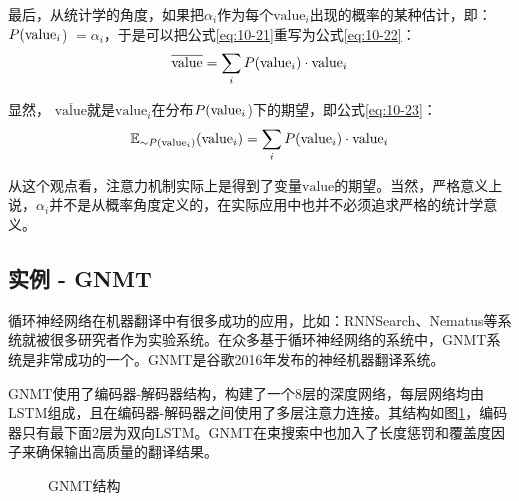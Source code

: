 \parinterval 最后，从统计学的角度，如果把$\alpha_i$作为每个$\mathrm{value}_i$出现的概率的某种估计，即：$ {P} (\mathrm{value}_i$) $= \alpha_i$，于是可以把公式\eqref{eq:10-21}重写为公式\eqref{eq:10-22}：
\begin{eqnarray}
\overline{\mathrm{value}} = \sum_i {P} ( {\mathrm{value}}_i) \cdot {\mathrm{value}}_i
\label{eq:10-22}
\end{eqnarray}

\noindent 显然， $\overline{\mathrm{value}}$就是$\mathrm{value}_i$在分布$ {P}( \mathrm{value}_i$)下的期望，即公式\eqref{eq:10-23}：
\begin{equation}
\mathbb{E}_{\sim \\ {P} ( {\mathrm{\mathrm{value}}}_i )} ({\mathrm{value}}_i) = \sum_i {P} ({\mathrm{value}}_i) \cdot {\mathrm{value}}_i
\label{eq:10-23}
\end{equation}

从这个观点看，注意力机制实际上是得到了变量$\mathrm{value}$的期望。当然，严格意义上说，$\alpha_i$并不是从概率角度定义的，在实际应用中也并不必须追求严格的统计学意义。

\subsection{实例 - GNMT}
\vspace{0.5em}

\parinterval 循环神经网络在机器翻译中有很多成功的应用，比如：RNNSearch、Nematus等系统就被很多研究者作为实验系统。在众多基于循环神经网络的系统中，GNMT系统是非常成功的一个。GNMT是谷歌2016年发布的神经机器翻译系统。

\parinterval GNMT使用了编码器-解码器结构，构建了一个8层的深度网络，每层网络均由LSTM组成，且在编码器-解码器之间使用了多层注意力连接。其结构如图\ref{fig:10-24}，编码器只有最下面2层为双向LSTM。GNMT在束搜索中也加入了长度惩罚和覆盖度因子来确保输出高质量的翻译结果。
\vspace{0.5em}

\begin{figure}[htp]
\centering

\caption{GNMT结构}
\label{fig:10-24}
\end{figure}

